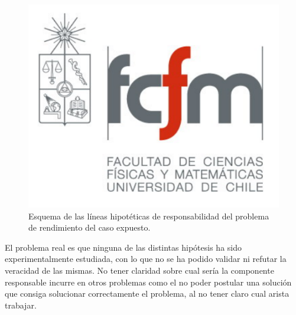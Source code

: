 \begin{figure}[!h]
	\centering
	\includegraphics[scale=.5]{imagenes/fcfm}
	\caption{Esquema de las líneas hipotéticas de responsabilidad del problema de rendimiento del caso expuesto.}
	\label{fig:hipotesis}
\end{figure}

El problema real es que ninguna de las distintas hipótesis ha sido experimentalmente estudiada, con lo que no se ha podido validar ni refutar la veracidad de las mismas. No tener claridad sobre cual sería la componente responsable incurre en otros problemas como el no poder postular una solución que consiga solucionar correctamente el problema, al no tener claro cual arista trabajar.